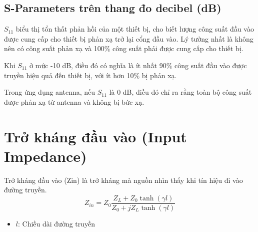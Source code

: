         \subsection{S-Parameters trên thang đo decibel (dB)}
            $S_{11}$ biểu thị tổn thất phản hồi của một thiết bị, 
            cho biết lượng công suất đầu vào được cung cấp cho thiết bị 
            phản xạ trở lại cổng đầu vào. 
            Lý tưởng nhất là không nên có công suất phản xạ và 
            100\% công suất phải được cung cấp cho thiết bị.\par

            Khi $S_{11}$ ở mức -10 dB, điều đó có nghĩa là ít nhất 90\% 
            công suất đầu vào được truyền hiệu quả đến thiết bị, 
            với ít hơn 10\% bị phản xạ.

            Trong ứng dụng antenna, nếu $S_{11}$ là 0 dB, điều đó chỉ ra rằng
            toàn bộ công suất được phản xạ từ antenna và không bị bức xạ.\par

    \section{Trở kháng đầu vào (Input Impedance)}
        Trở kháng đầu vào (Zin) là trở kháng mà nguồn nhìn thấy khi tín hiệu đi vào đường truyền.
        \begin{equation}
            Z_{in} = Z_0 \frac{Z_L + Z_0 \tanh(\gamma l)}{Z_0 + jZ_L \tanh(\gamma l)}
            \label{eq:zin}    
        \end{equation}
        
        \begin{itemize}
            \item $l$: Chiều dài đường truyền
        \end{itemize}

